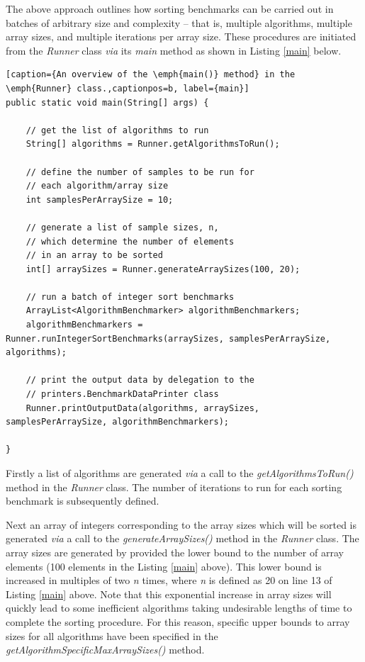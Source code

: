 \documentclass[12pt,a4paper]{article}
\begin{document}
The above approach outlines how sorting benchmarks can be carried out in batches of arbitrary size and complexity -- that is, multiple algorithms, multiple array sizes, and multiple iterations per array size. These procedures are initiated from the \emph{Runner} class \emph{via} its \emph{main} method as shown in Listing \ref{main} below.

\begin{lstlisting}[caption={An overview of the \emph{main()} method} in the \emph{Runner} class.,captionpos=b, label={main}]
public static void main(String[] args) {

	// get the list of algorithms to run
	String[] algorithms = Runner.getAlgorithmsToRun();
	
	// define the number of samples to be run for
	// each algorithm/array size
	int samplesPerArraySize = 10;

	// generate a list of sample sizes, n, 
	// which determine the number of elements
	// in an array to be sorted
	int[] arraySizes = Runner.generateArraySizes(100, 20);

	// run a batch of integer sort benchmarks
	ArrayList<AlgorithmBenchmarker> algorithmBenchmarkers;
	algorithmBenchmarkers = Runner.runIntegerSortBenchmarks(arraySizes, samplesPerArraySize, algorithms);

	// print the output data by delegation to the 
	// printers.BenchmarkDataPrinter class
	Runner.printOutputData(algorithms, arraySizes, samplesPerArraySize, algorithmBenchmarkers);

}
\end{lstlisting}

Firstly a list of algorithms are generated \emph{via} a call to the \emph{getAlgorithmsToRun()} method in the \emph{Runner} class. The number of iterations to run for each sorting benchmark is subsequently defined. 

Next an array of integers corresponding to the array sizes which will be sorted is generated \emph{via} a call to the \emph{generateArraySizes()} method in the \emph{Runner} class. The array sizes are generated by provided the lower bound to the number of array elements (100 elements in the Listing \ref{main} above). This lower bound is increased in multiples of two \emph{n} times, where \emph{n} is defined as 20 on line 13 of Listing \ref{main} above. Note that this exponential increase in array sizes will quickly lead to some inefficient algorithms taking undesirable lengths of time to complete the sorting procedure. For this reason, specific upper bounds to array sizes for all algorithms have been specified in the \emph{getAlgorithmSpecificMaxArraySizes()} method. 
\end{document}
